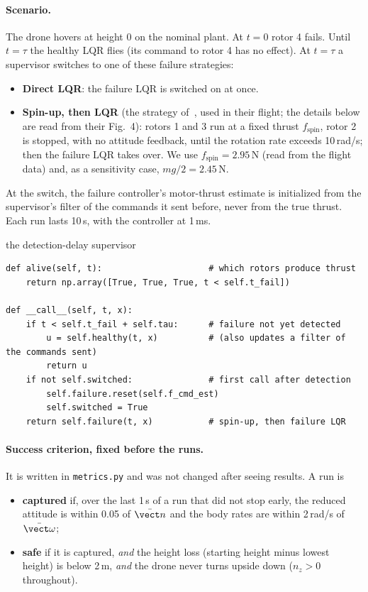 \paragraph{Scenario.} The drone hovers at height 0 on the nominal plant. At $t=0$ rotor 4 fails. Until $t=\tau$ the healthy LQR flies (its command to rotor 4 has no effect). At $t=\tau$ a supervisor switches to one of these failure strategies:
\begin{itemize}
  \item \textbf{Direct LQR}: the failure LQR is switched on at once.
  \item \textbf{Spin-up, then LQR} (the strategy of~\cite{mueller2014stability}, used in their flight; the details below are read from their Fig.~4): rotors 1 and 3 run at a fixed thrust $f_{\text{spin}}$, rotor 2 is stopped, with no attitude feedback, until the rotation rate exceeds 10\,rad/s; then the failure LQR takes over. We use $f_{\text{spin}} = 2.95$\,N (read from the flight data) and, as a sensitivity case, $mg/2 = 2.45$\,N.
\end{itemize}
At the switch, the failure controller's motor-thrust estimate is initialized from the supervisor's filter of the commands it sent before, never from the true thrust. Each run lasts 10\,s, with the controller at 1\,ms.

\begin{codebox}{the detection-delay supervisor}
\begin{lstlisting}
def alive(self, t):                     # which rotors produce thrust
    return np.array([True, True, True, t < self.t_fail])

def __call__(self, t, x):
    if t < self.t_fail + self.tau:      # failure not yet detected
        u = self.healthy(t, x)          # (also updates a filter of the commands sent)
        return u
    if not self.switched:               # first call after detection
        self.failure.reset(self.f_cmd_est)
        self.switched = True
    return self.failure(t, x)           # spin-up, then failure LQR
\end{lstlisting}
\end{codebox}

\paragraph{Success criterion, fixed before the runs.} It is written in \texttt{metrics.py} and was not changed after seeing results. A run is
\begin{itemize}
  \item \textbf{captured} if, over the last 1\,s of a run that did not stop early, the reduced attitude is within 0.05 of $\bar{\vect n}$ and the body rates are within 2\,rad/s of $\bar{\vect\omega}$;
  \item \textbf{safe} if it is captured, \emph{and} the height loss (starting height minus lowest height) is below 2\,m, \emph{and} the drone never turns upside down ($n_z > 0$ throughout).
\end{itemize}


